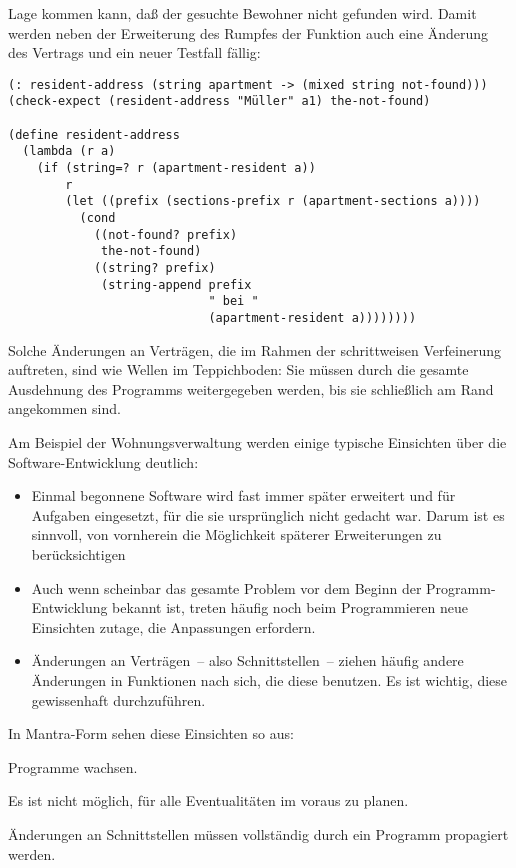 Lage kommen kann, daß der gesuchte Bewohner nicht gefunden wird.
Damit werden neben der Erweiterung des Rumpfes der Funktion auch eine
Änderung des Vertrags und ein neuer Testfall fällig:
%
\begin{verbatim}
(: resident-address (string apartment -> (mixed string not-found)))
(check-expect (resident-address "Müller" a1) the-not-found)

(define resident-address
  (lambda (r a)
    (if (string=? r (apartment-resident a))
        r
        (let ((prefix (sections-prefix r (apartment-sections a))))
          (cond
            ((not-found? prefix)
             the-not-found)
            ((string? prefix)
             (string-append prefix
                            " bei "
                            (apartment-resident a))))))))
\end{verbatim}
%
Solche Änderungen an Verträgen, die im Rahmen der schrittweisen
Verfeinerung auftreten, sind wie Wellen im Teppichboden:  Sie müssen
durch die gesamte Ausdehnung des Programms weitergegeben werden, bis
sie schließlich am Rand angekommen sind.

Am Beispiel der Wohnungsverwaltung werden einige typische Einsichten
über die Software-Entwicklung deutlich:
%
\begin{itemize}
\item Einmal begonnene Software wird fast immer später erweitert und
  für Aufgaben eingesetzt, für die sie ursprünglich nicht gedacht war.
  Darum ist es sinnvoll, von vornherein die Möglichkeit späterer
  Erweiterungen zu berücksichtigen
\item Auch wenn scheinbar das gesamte Problem vor dem Beginn der
  Programm-Entwicklung bekannt ist, treten häufig noch beim
  Programmieren neue Einsichten zutage, die Anpassungen erfordern.
\item Änderungen an Verträgen~-- also Schnittstellen~-- ziehen häufig
  andere Änderungen in Funktionen nach sich, die diese benutzen.   Es
  ist wichtig, diese gewissenhaft durchzuführen.
\end{itemize}

In Mantra-Form sehen diese Einsichten so aus:
%
\begin{mantra}
  Programme wachsen.
\end{mantra}

\begin{mantra}
  Es ist nicht möglich, für alle Eventualitäten im voraus zu planen.
\end{mantra}

\begin{mantra}
  Änderungen an Schnittstellen müssen vollständig durch ein Programm
  propagiert werden.
\end{mantra}


